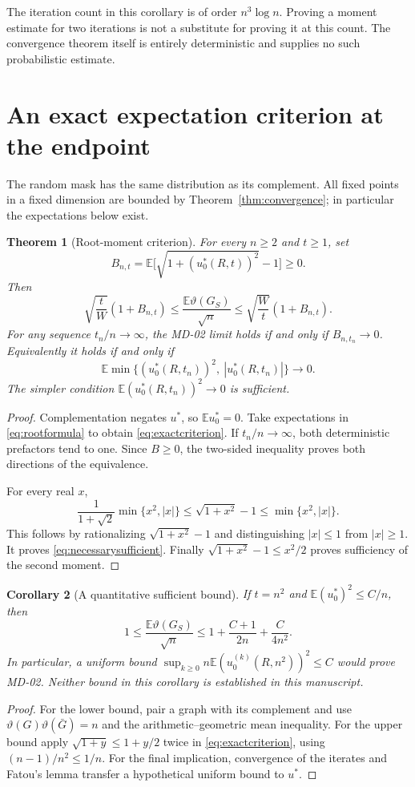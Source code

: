 \documentclass[11pt]{article}
\newtheorem{theorem}{Theorem}[section]
\newtheorem{corollary}[theorem]{Corollary}
\theoremstyle{remark}\newtheorem{remark}[theorem]{Remark}
\newcommand{\E}{\mathbb E}
\newcommand{\tht}{\vartheta}
\begin{document}
The iteration count in this corollary is of order $n^3\log n$. Proving a
moment estimate for two iterations is not a substitute for proving it at this
count. The convergence theorem itself is entirely deterministic and supplies
no such probabilistic estimate.

\section{An exact expectation criterion at the endpoint}
The random mask has the same distribution as its complement. All fixed
points in a fixed dimension are bounded by Theorem~\ref{thm:convergence};
in particular the expectations below exist.

\begin{theorem}[Root-moment criterion]\label{thm:criterion}
For every $n\ge2$ and $t\ge1$, set
\[
 B_{n,t}=\E\bigl[\sqrt{1+(u^*_0(R,t))^2}-1\bigr]\ge0.
\]
Then
\begin{equation}\label{eq:exactcriterion}
 \sqrt{\frac tW}(1+B_{n,t})
 \le\frac{\E\tht(G_S)}{\sqrt n}
 \le\sqrt{\frac Wt}(1+B_{n,t}).
\end{equation}
For any sequence $t_n/n\to\infty$, the MD-02 limit holds if and only if
$B_{n,t_n}\to0$. Equivalently it holds if and only if
\begin{equation}\label{eq:necessarysufficient}
 \E\min\{(u^*_0(R,t_n))^2,\ |u^*_0(R,t_n)|\}\longrightarrow0.
\end{equation}
The simpler condition $\E(u^*_0(R,t_n))^2\to0$ is sufficient.
\end{theorem}
\begin{proof}
Complementation negates $u^*$, so $\E u^*_0=0$. Take expectations in
\eqref{eq:rootformula} to obtain \eqref{eq:exactcriterion}. If $t_n/n\to\infty$,
both deterministic prefactors tend to one. Since $B\ge0$, the two-sided
inequality proves both directions of the equivalence.

For every real $x$,
\[
 \frac1{1+\sqrt2}\min\{x^2,|x|\}
 \le\sqrt{1+x^2}-1
 \le\min\{x^2,|x|\}.
\]
This follows by rationalizing $\sqrt{1+x^2}-1$ and distinguishing
$|x|\le1$ from $|x|\ge1$. It proves \eqref{eq:necessarysufficient}.
Finally $\sqrt{1+x^2}-1\le x^2/2$ proves sufficiency of the second moment.
\end{proof}

\begin{corollary}[A quantitative sufficient bound]\label{cor:rate}
If $t=n^2$ and $\E(u^*_0)^2\le C/n$, then
\[
 1\le\frac{\E\tht(G_S)}{\sqrt n}
 \le 1+\frac{C+1}{2n}+\frac{C}{4n^2}.
\]
In particular, a uniform bound
$\sup_{k\ge0}n\E(u^{(k)}_0(R,n^2))^2\le C$ would prove MD-02.
Neither bound in this corollary is established in this manuscript.
\end{corollary}
\begin{proof}
For the lower bound, pair a graph with its complement and use
$\tht(G)\tht(\bar G)=n$ and the arithmetic--geometric mean inequality.
For the upper bound apply $\sqrt{1+y}\le1+y/2$ twice in
\eqref{eq:exactcriterion}, using $(n-1)/n^2\le1/n$.
For the final implication, convergence of the iterates and Fatou's lemma
transfer a hypothetical uniform bound to $u^*$.
\end{proof}
\end{document}
